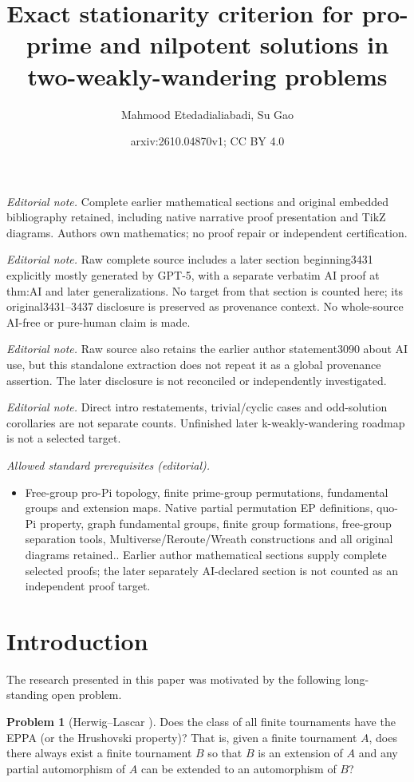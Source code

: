 \documentclass[10pt,a4paper]{amsart}
\title{Exact stationarity criterion for pro-prime and nilpotent solutions in two-weakly-wandering problems}
\author{Mahmood Etedadialiabadi, Su Gao}
\date{arxiv:2610.04870v1; CC BY 4.0}
\theoremstyle{definition}
\newtheorem{problem}[theorem]{Problem}
\theoremstyle{definition}
\numberwithin{equation}{section}
\begin{document}
\maketitle
\noindent\textit{Editorial note.} Complete earlier mathematical sections and original embedded bibliography retained, including native narrative proof presentation and TikZ diagrams. Authors own mathematics; no proof repair or independent certification.\par\medskip
\noindent\textit{Editorial note.} Raw complete source includes a later section beginning3431 explicitly mostly generated by GPT-5, with a separate verbatim AI proof at thm:AI and later generalizations. No target from that section is counted here; its original3431--3437 disclosure is preserved as provenance context. No whole-source AI-free or pure-human claim is made.\par\medskip
\noindent\textit{Editorial note.} Raw source also retains the earlier author statement3090 about AI use, but this standalone extraction does not repeat it as a global provenance assertion. The later disclosure is not reconciled or independently investigated.\par\medskip
\noindent\textit{Editorial note.} Direct intro restatements, trivial/cyclic cases and odd-solution corollaries are not separate counts. Unfinished later k-weakly-wandering roadmap is not a selected target.\par\medskip
\noindent\textit{Allowed standard prerequisites (editorial).}\begin{itemize}
\item Free-group pro-Pi topology, finite prime-group permutations, fundamental groups and extension maps. Native partial permutation EP definitions, quo-Pi property, graph fundamental groups, finite group formations, free-group separation tools, Multiverse/Reroute/Wreath constructions and all original diagrams retained.. Earlier author mathematical sections supply complete selected proofs; the later separately AI-declared section is not counted as an independent proof target.
\end{itemize}\medskip
\section{Introduction}

The research presented in this paper was motivated by the following long-standing open problem.


\begin{problem} [Herwig--Lascar \cite{HL00}]\label{prob:1.1} Does the class of all finite tournaments have the EPPA (or the Hrushovski property)? That is, given a finite tournament $A$, does there always exist a finite tournament $B$ so that $B$ is an extension of $A$ and any partial automorphism of $A$ can be extended to an automorphism of $B$?
\end{problem}
\end{document}
